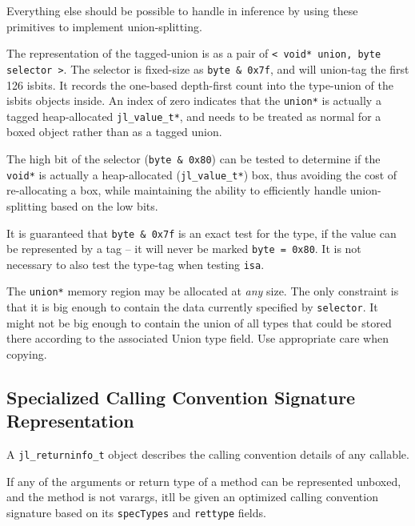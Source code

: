 Everything else should be possible to handle in inference by using these primitives to implement union-splitting.



The representation of the tagged-union is as a pair of \texttt{< void* union, byte selector >}. The selector is fixed-size as \texttt{byte \& 0x7f}, and will union-tag the first 126 isbits. It records the one-based depth-first count into the type-union of the isbits objects inside. An index of zero indicates that the \texttt{union*} is actually a tagged heap-allocated \texttt{jl\_value\_t*}, and needs to be treated as normal for a boxed object rather than as a tagged union.



The high bit of the selector (\texttt{byte \& 0x80}) can be tested to determine if the \texttt{void*} is actually a heap-allocated (\texttt{jl\_value\_t*}) box, thus avoiding the cost of re-allocating a box, while maintaining the ability to efficiently handle union-splitting based on the low bits.



It is guaranteed that \texttt{byte \& 0x7f} is an exact test for the type, if the value can be represented by a tag – it will never be marked \texttt{byte = 0x80}. It is not necessary to also test the type-tag when testing \texttt{isa}.



The \texttt{union*} memory region may be allocated at \emph{any} size. The only constraint is that it is big enough to contain the data currently specified by \texttt{selector}. It might not be big enough to contain the union of all types that could be stored there according to the associated Union type field. Use appropriate care when copying.



\hypertarget{5801902447580234191}{}


\subsection{Specialized Calling Convention Signature Representation}



A \texttt{jl\_returninfo\_t} object describes the calling convention details of any callable.



If any of the arguments or return type of a method can be represented unboxed, and the method is not varargs, it{\textquotesingle}ll be given an optimized calling convention signature based on its \texttt{specTypes} and \texttt{rettype} fields.



